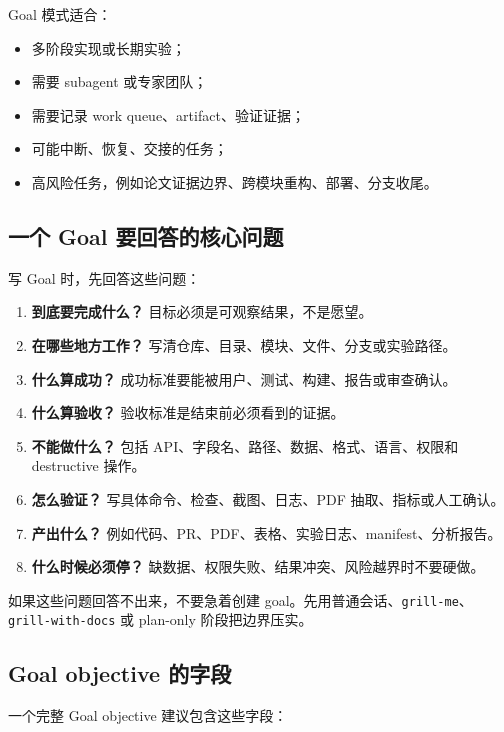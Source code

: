\documentclass[UTF8,a4paper,11pt,fontset=none]{ctexart}
\newcommand{\skill}[1]{\texttt{#1}}
\newcommand{\keypoint}[1]{\textbf{#1}}
\begin{document}
Goal 模式适合：

\begin{itemize}
  \item 多阶段实现或长期实验；
  \item 需要 subagent 或专家团队；
  \item 需要记录 work queue、artifact、验证证据；
  \item 可能中断、恢复、交接的任务；
  \item 高风险任务，例如论文证据边界、跨模块重构、部署、分支收尾。
\end{itemize}

\subsection{一个 Goal 要回答的核心问题}

写 Goal 时，先回答这些问题：

\begin{enumerate}
  \item \keypoint{到底要完成什么？} 目标必须是可观察结果，不是愿望。
  \item \keypoint{在哪些地方工作？} 写清仓库、目录、模块、文件、分支或实验路径。
  \item \keypoint{什么算成功？} 成功标准要能被用户、测试、构建、报告或审查确认。
  \item \keypoint{什么算验收？} 验收标准是结束前必须看到的证据。
  \item \keypoint{不能做什么？} 包括 API、字段名、路径、数据、格式、语言、权限和 destructive 操作。
  \item \keypoint{怎么验证？} 写具体命令、检查、截图、日志、PDF 抽取、指标或人工确认。
  \item \keypoint{产出什么？} 例如代码、PR、PDF、表格、实验日志、manifest、分析报告。
  \item \keypoint{什么时候必须停？} 缺数据、权限失败、结果冲突、风险越界时不要硬做。
\end{enumerate}

如果这些问题回答不出来，不要急着创建 goal。先用普通会话、\skill{grill-me}、\skill{grill-with-docs} 或 plan-only 阶段把边界压实。

\subsection{Goal objective 的字段}

一个完整 Goal objective 建议包含这些字段：
\end{document}
